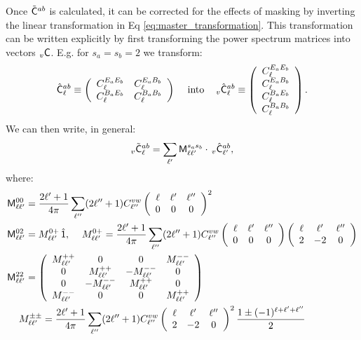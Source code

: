 \documentclass[a4paper,10pt]{article}
\newcommand{\wtj}[6]{\left(\begin{array}{ccc} #1 & #2 & #3\\#4 & #5 & #6\end{array} \right)}
\begin{document}
    Once $\tilde{\sf C}^{ab}$ is calculated, it can be corrected for the effects of masking by inverting the linear transformation in Eq \ref{eq:master_transformation}. This transformation can be written explicitly by first transforming the power spectrum matrices into vectors $_v{\sf C}$. E.g. for $s_a=s_b=2$ we transform:
    \begin{equation}
      \hat{\sf C}^{ab}_\ell\equiv\left(
      \begin{array}{cc}
        C^{E_aE_b}_\ell & C^{E_aB_b}_\ell \\
        C^{B_aE_b}_\ell & C^{B_aB_b}_\ell
      \end{array}\right)
      \hspace{12pt}\text{into}\hspace{12pt}
      _v\hat{\sf C}^{ab}_\ell\equiv\left(
      \begin{array}{c}
        C^{E_aE_b}_\ell\\
        C^{E_aB_b}_\ell\\
        C^{B_aE_b}_\ell\\
        C^{B_aB_b}_\ell
      \end{array}\right).
    \end{equation}
    We can then write, in general:
    \begin{equation}\label{eq:cell_coupled}
      _v\tilde{\sf C}^{ab}_\ell=\sum_{\ell'}{\sf M}^{s_as_b}_{\ell\ell'}\cdot\,_v\hat{\sf C}^{ab}_{\ell'},
    \end{equation}
    where:
    \begin{align}
      &{\sf M}^{00}_{\ell\ell'}=\frac{2\ell'+1}{4\pi}\sum_{\ell''}(2\ell''+1)C^{vw}_{\ell''}\wtj{\ell}{\ell'}{\ell''}{0}{0}{0}^2\\
      &{\sf M}^{02}_{\ell\ell'}=M^{0+}_{\ell\ell'}\,\hat{\sf 1},
      \hspace{12pt}
      M^{0+}_{\ell\ell'}=\frac{2\ell'+1}{4\pi}\sum_{\ell''}(2\ell''+1)C^{vw}_{\ell''}\wtj{\ell}{\ell'}{\ell''}{0}{0}{0}\wtj{\ell}{\ell'}{\ell''}{2}{-2}{0}\\
      &{\sf M}^{22}_{\ell\ell'}=\left(
      \begin{array}{cccc}
        M^{++}_{\ell\ell'} &0 &0&M^{--}_{\ell\ell'}\\
        0&M^{++}_{\ell\ell'} &-M^{--}_{\ell\ell'}&0\\
        0&-M^{--}_{\ell\ell'} &M^{++}_{\ell\ell'}&0\\
        M^{--}_{\ell\ell'} &0 &0&M^{++}_{\ell\ell'}
      \end{array}\right)\\
      & \hspace{12pt}M^{\pm\pm}_{\ell\ell'}=\frac{2\ell'+1}{4\pi}\sum_{\ell''}(2\ell''+1)C^{vw}_{\ell''}\wtj{\ell}{\ell'}{\ell''}{2}{-2}{0}^2\frac{1\pm(-1)^{\ell+\ell'+\ell''}}{2}
    \end{align}
\end{document}
